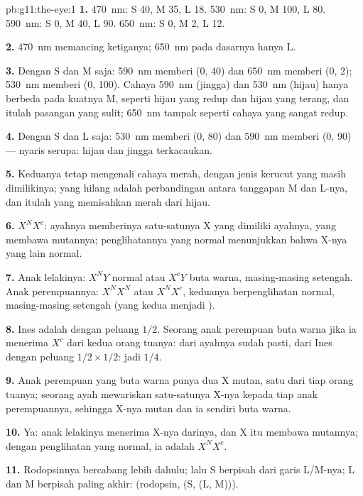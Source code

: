 \begin{solution}{pb:g11:the-eye:1}
\textbf{1.} \qty{470}{nm}: S 40, M 35, L 18. \qty{530}{nm}: S 0, M 100,
L 80. \qty{590}{nm}: S 0, M 40, L 90. \qty{650}{nm}: S 0, M 2, L 12.

\textbf{2.} \qty{470}{nm} memancing ketiganya; \qty{650}{nm} pada
dasarnya hanya L.

\textbf{3.} Dengan S dan M saja: \qty{590}{nm} memberi (0, 40) dan
\qty{650}{nm} memberi (0, 2); \qty{530}{nm} memberi (0, 100). Cahaya
\qty{590}{nm} (jingga) dan \qty{530}{nm} (hijau) hanya berbeda pada
kuatnya M, seperti hijau yang redup dan hijau yang terang, dan itulah
pasangan yang sulit; \qty{650}{nm} tampak seperti cahaya yang sangat redup.

\textbf{4.} Dengan S dan L saja: \qty{530}{nm} memberi (0, 80) dan
\qty{590}{nm} memberi (0, 90) --- nyaris serupa: hijau dan jingga terkacaukan.

\textbf{5.} Keduanya tetap mengenali cahaya merah, dengan jenis kerucut
yang masih dimilikinya; yang hilang adalah perbandingan antara
tanggapan M dan L-nya, dan itulah yang memisahkan merah dari hijau.

\textbf{6.} $X^NX^c$: ayahnya memberinya satu-satunya X yang dimiliki
ayahnya, yang membawa  mutannya; penglihatannya yang normal
menunjukkan bahwa X-nya yang lain normal.

\textbf{7.} Anak lelakinya: $X^NY$ normal atau $X^cY$ buta warna,
masing-masing setengah. Anak perempuannya: $X^NX^N$ atau $X^NX^c$,
keduanya berpenglihatan normal, masing-masing setengah (yang kedua
menjadi ).

\textbf{8.} Ines adalah  dengan peluang $1/2$. Seorang anak
perempuan buta warna jika ia menerima $X^c$ dari kedua orang tuanya:
dari ayahnya sudah pasti, dari Ines dengan peluang $1/2 \times 1/2$:
jadi $1/4$.

\textbf{9.} Anak perempuan yang buta warna punya dua  X mutan,
satu dari tiap orang tuanya; seorang ayah mewariskan satu-satunya X-nya
kepada tiap anak perempuannya, sehingga X-nya mutan dan ia sendiri buta warna.

\textbf{10.} Ya: anak lelakinya menerima X-nya darinya, dan X itu
membawa  mutannya; dengan penglihatan yang normal, ia adalah
$X^NX^c$.

\textbf{11.} Rodopsinnya bercabang lebih dahulu; lalu S berpisah dari
garis L/M-nya; L dan M berpisah paling akhir: (rodopsin, (S, (L, M))).


\end{solution}

